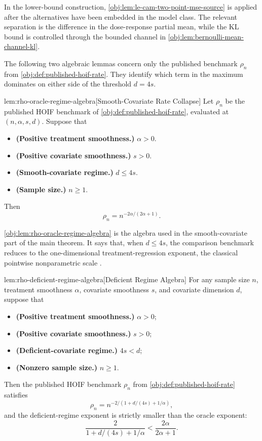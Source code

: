 In the lower-bound construction, \cref{obj:lem:le-cam-two-point-mse-source} is applied after the alternatives have been embedded in the model class. The relevant separation is the difference in the dose-response partial mean, while the KL bound is controlled through the bounded channel in \cref{obj:lem:bernoulli-mean-channel-kl}.

The following two algebraic lemmas concern only the published benchmark \(\rho_n\) from \cref{obj:def:published-hoif-rate}. They identify which term in the maximum dominates on either side of the threshold \(d=4s\).

\begin{lemmav}{lem:rho-oracle-regime-algebra}[Smooth-Covariate Rate Collapse]
Let $\rho_n$ be the published HOIF benchmark of \cref{obj:def:published-hoif-rate}, evaluated at $(n,\alpha,s,d)$. Suppose that
\begin{itemize}
\item \textbf{(Positive treatment smoothness.)} $\alpha>0$.
\item \textbf{(Positive covariate smoothness.)} $s>0$.
\item \textbf{(Smooth-covariate regime.)} $d\le 4s$.
\item \textbf{(Sample size.)} $n\ge 1$.
\end{itemize}
Then
\[
\rho_n
=
n^{-2\alpha/(2\alpha+1)} .
\]
\end{lemmav}

\cref{obj:lem:rho-oracle-regime-algebra} is the algebra used in the smooth-covariate part of the main theorem. It says that, when \(d\le 4s\), the comparison benchmark reduces to the one-dimensional treatment-regression exponent, the classical pointwise nonparametric scale \citep{stone1982,tsybakov2009}.

\begin{lemmav}{lem:rho-deficient-regime-algebra}[Deficient Regime Algebra]
For any sample size $n$, treatment smoothness $\alpha$, covariate smoothness $s$, and covariate dimension $d$, suppose that
\begin{itemize}
\item \textbf{(Positive treatment smoothness.)} $\alpha>0$;
\item \textbf{(Positive covariate smoothness.)} $s>0$;
\item \textbf{(Deficient-covariate regime.)} $4s<d$;
\item \textbf{(Nonzero sample size.)} $n\ge 1$.
\end{itemize}
Then the published HOIF benchmark $\rho_n$ from \cref{obj:def:published-hoif-rate} satisfies
\[
\rho_n
=
n^{-2/(1+d/(4s)+1/\alpha)},
\]
and the deficient-regime exponent is strictly smaller than the oracle exponent:
\[
\frac{2}{1+d/(4s)+1/\alpha}
<
\frac{2\alpha}{2\alpha+1}.
\]
\end{lemmav}


